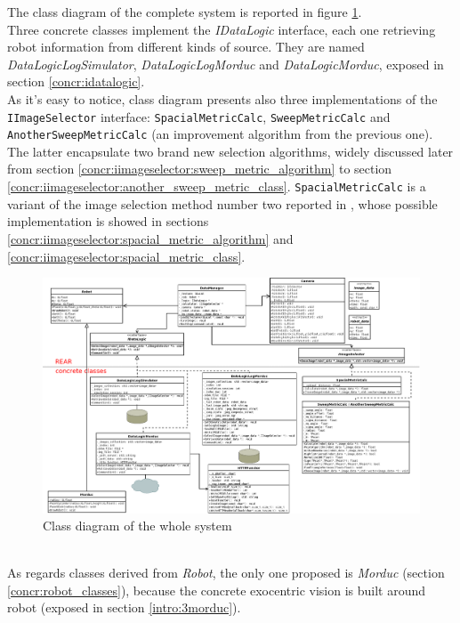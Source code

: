 The class diagram of the complete system is reported in figure
\ref{fig:class_diagram_complete}. 
\\
Three concrete classes implement the \textit{IDataLogic} interface,
each one retrieving robot information from different kinds of source.
They are named \textit{DataLogicLogSimulator}, \textit{DataLogicLogMorduc}
and \textit{DataLogicMorduc}, exposed in section \ref{concr:idatalogic}.
\\
As it's easy to notice, class diagram presents also three implementations 
of the \texttt{IImageSelector} interface: \texttt{SpacialMetricCalc},
\texttt{SweepMetricCalc} and \texttt{AnotherSweepMetricCalc}
(an improvement algorithm from the previous one).
The latter encapsulate two brand new selection algorithms,
widely discussed later from section
\ref{concr:iimageselector:sweep_metric_algorithm} to section
\ref{concr:iimageselector:another_sweep_metric_class}.
\texttt{SpacialMetricCalc} is a variant 
of the image selection method number two reported in \cite{sugimoto}, 
whose possible implementation is showed in sections
\ref{concr:iimageselector:spacial_metric_algorithm} and
\ref{concr:iimageselector:spacial_metric_class}.
\begin{figure}[!h]
  \begin{center}
    \includegraphics[width=\textheight, angle=90]{img/class_diagram.png} 
    \caption{Class diagram of the whole system}
    \label{fig:class_diagram_complete}
  \end{center}
\end{figure}
\\
As regards classes derived from \textit{Robot}, the only one proposed
is \textit{Morduc} (section \ref{concr:robot_classes}), because
the concrete \framework{} exocentric vision
is built around \morduc{} robot (exposed in section \ref{intro:3morduc}).

\clearpage

\clearpage

\clearpage

